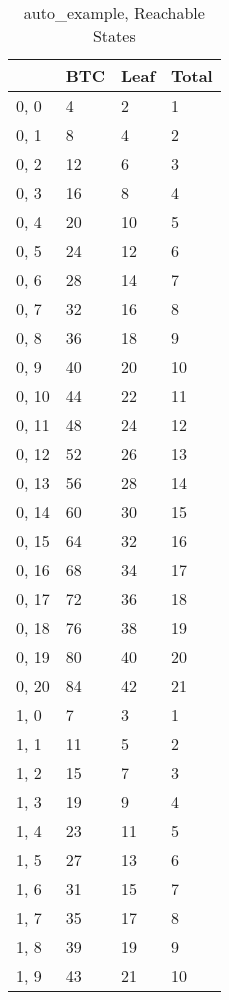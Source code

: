 \begin{table}
\centering
\caption{auto_example, Reachable States}
\label{auto_example_reach}
\begin{tabular}{llll}
\toprule
{} &     BTC & Leaf & Total \\
\midrule
0, 0   &       4 &    2 &     1 \\
0, 1   &       8 &    4 &     2 \\
0, 2   &      12 &    6 &     3 \\
0, 3   &      16 &    8 &     4 \\
0, 4   &      20 &   10 &     5 \\
0, 5   &      24 &   12 &     6 \\
0, 6   &      28 &   14 &     7 \\
0, 7   &      32 &   16 &     8 \\
0, 8   &      36 &   18 &     9 \\
0, 9   &      40 &   20 &    10 \\
0, 10  &      44 &   22 &    11 \\
0, 11  &      48 &   24 &    12 \\
0, 12  &      52 &   26 &    13 \\
0, 13  &      56 &   28 &    14 \\
0, 14  &      60 &   30 &    15 \\
0, 15  &      64 &   32 &    16 \\
0, 16  &      68 &   34 &    17 \\
0, 17  &      72 &   36 &    18 \\
0, 18  &      76 &   38 &    19 \\
0, 19  &      80 &   40 &    20 \\
0, 20  &      84 &   42 &    21 \\
1, 0   &       7 &    3 &     1 \\
1, 1   &      11 &    5 &     2 \\
1, 2   &      15 &    7 &     3 \\
1, 3   &      19 &    9 &     4 \\
1, 4   &      23 &   11 &     5 \\
1, 5   &      27 &   13 &     6 \\
1, 6   &      31 &   15 &     7 \\
1, 7   &      35 &   17 &     8 \\
1, 8   &      39 &   19 &     9 \\
1, 9   &      43 &   21 &    10 \\

\end{tabular}
\end{table}
